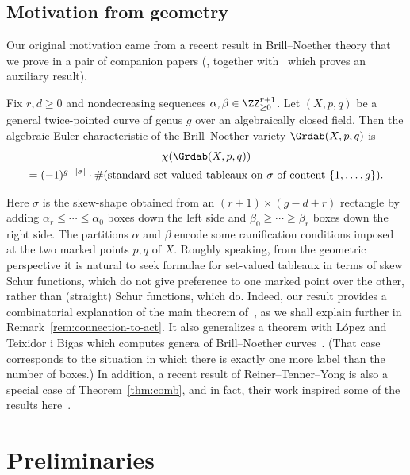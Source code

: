 \subsection*{Motivation from geometry} 
Our original motivation came from a recent result in Brill--Noether theory that we prove in a pair of companion papers (\cite{chan-pflueger-euler}, together with~\cite{chan-pflueger-relative} which proves an auxiliary result). 
\begin{theo} Fix $r,d\ge 0$ and nondecreasing sequences $\alpha,\beta\in\ZZ^{r+1}_{\ge 0}$. Let $(X,p,q)$ be a general twice-pointed curve of genus $g$ over an algebraically closed field.
Then the algebraic Euler characteristic of the Brill--Noether variety $\Grdab(X,p,q)$ is 
\begin{multline*}
\chi(\Grdab(X,p,q))\\ = (-1)^{g-|\sigma|} \cdot \#(\text{standard set-valued tableaux on $\sigma$ of %
content }\{1,\ldots,g\}).
\end{multline*}
\end{theo}	 
\noindent Here $\sigma$ is the skew-shape obtained from an $(r+1)\times (g-d+r)$ rectangle by adding $\alpha_r \le \cdots \le \alpha_0$ boxes down the left side and $\beta_0\ge \cdots \ge \beta_r$ boxes down the right side. The partitions $\alpha$ and $\beta$ encode some ramification conditions imposed at the two marked points $p,q$ of $X$. Roughly speaking, from the geometric perspective it is natural to seek formulae for set-valued tableaux in terms of skew Schur functions, which do not give preference to one marked point over the other, rather than (straight) Schur functions, which do.
Indeed, 
our result provides a combinatorial explanation of the main theorem of~\cite{anderson-chen-tarasca-k-classes}, as we shall explain further in Remark~\ref{rem:connection-to-act}. It also generalizes a theorem with L\'opez and Teixidor i Bigas which computes genera of Brill--Noether curves~\cite{clpt}. (That case corresponds to the situation in which there is exactly one more label than the number of boxes.) 
In addition, a recent result of Reiner--Tenner--Yong 
is also a special case of Theorem~\ref{thm:comb}, and in fact, their work inspired some of the results here~\cite[Corollary~3.11]{reiner-tenner-yong}. 

\section{Preliminaries}\label{sec:prelim}

